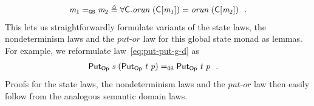 \documentclass{llncs}
\newcommand{\Conid}[1]{\mathit{#1}}
\newcommand{\Varid}[1]{\mathit{#1}}
\let\Varid\mathit
\let\Conid\mathsf
\begin{document}
\begin{align*}
  \ensuremath{\Varid{m}_{1}} \CEq \ensuremath{\Varid{m}_{2}} \triangleq \forall \ensuremath{\Conid{C}}. \ensuremath{\Varid{orun}\;(\Conid{C}\lbrack\Varid{m}_{1}\rbrack)} = \ensuremath{\Varid{orun}\;(\Conid{C}\lbrack\Varid{m}_{2}\rbrack)} \mbox{~~.}
\end{align*}
This lets us straightforwardly formulate variants of the state laws, the
nondeterminism laws and the \ensuremath{\Varid{put}}-\ensuremath{\Varid{or}} law for this global state monad as
lemmas. For example, we reformulate law~\eqref{eq:put-put-g-d} as
\begin{align*}
  \ensuremath{\Conid{Put}_\Conid{Op}\;\Varid{s}\;(\Conid{Put}_\Conid{Op}\;\Varid{t}\;\Varid{p})} &\CEq \ensuremath{\Conid{Put}_\Conid{Op}\;\Varid{t}\;\Varid{p}} \mbox{~~.}
\end{align*}
Proofs for the state laws, the nondeterminism laws and the \ensuremath{\Varid{put}}-\ensuremath{\Varid{or}} law then
easily follow from the analogous semantic domain laws.
\end{document}

